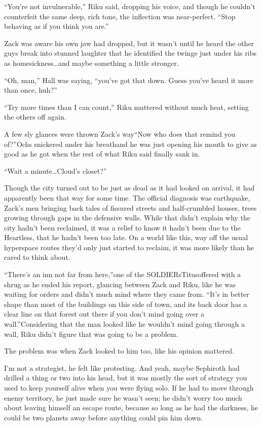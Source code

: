 ``You're not invulnerable,'' Riku said, dropping his voice, and though he couldn't counterfeit the same deep, rich tone, the inflection was near-perfect. ``Stop behaving as if you think you are.''

Zack was aware his own jaw had dropped, but it wasn't until he heard the other guys break into stunned laughter that he identified the twinge just under his ribs as homesickness\ldots and maybe something a little stronger.

``Oh, man,'' Hall was saying, ``you've got that down. Guess you've heard it more than once, huh?''

``Try more times than I can count,'' Riku muttered without much heat, setting the others off again.

A few sly glances were thrown Zack's way\textemdash ``Now who does that remind you of?''Ochs snickered under his breath\textemdash and he was just opening his mouth to give as good as he got when the rest of what Riku said finally sank in.

``Wait a minute\ldots Cloud's closet?''


\scenechange


Though the city turned out to be just as dead as it had looked on arrival, it had apparently been that way for some time. The official diagnosis was earthquake, Zack's men bringing back tales of fissured streets and half-crumbled houses, trees growing through gaps in the defensive walls. While that didn't explain why the city hadn't been reclaimed, it was a relief to know it hadn't been due to the Heartless, that he hadn't been too late. On a world like this, way off the usual hyperspace routes they'd only just started to reclaim, it was more likely than he cared to think about.

``There's an inn not far from here,''one of the SOLDIERs\textemdash Titus\textemdash offered with a shrug as he ended his report, glancing between Zack and Riku, like he was waiting for orders and didn't much mind where they came from. ``It's in better shape than most of the buildings on this side of town, and its back door has a clear line on that forest out there if you don't mind going over a wall.''Considering that the man looked like he wouldn't mind going through a wall, Riku didn't figure that was going to be a problem.

The problem was when Zack looked to him too, like his opinion mattered.

I'm not a strategist, he felt like protesting. And yeah, maybe Sephiroth had drilled a thing or two into his head, but it was mostly the sort of strategy you used to keep yourself alive when you were flying solo. If he had to move through enemy territory, he just made sure he wasn't seen; he didn't worry too much about leaving himself an escape route, because so long as he had the darkness, he could be two planets away before anything could pin him down.

